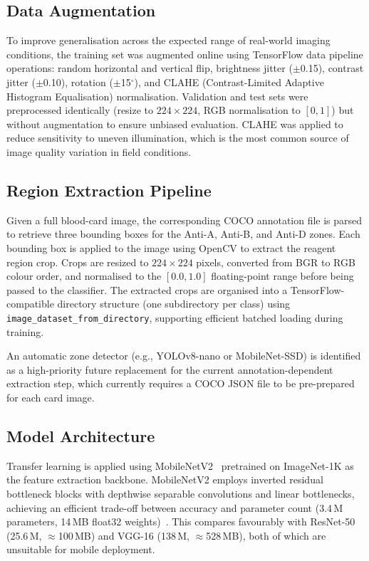 \documentclass[journal]{IEEEtran}
\begin{document}
\subsection{Data Augmentation}

To improve generalisation across the expected range of real-world
imaging conditions, the training set was augmented online using
TensorFlow data pipeline operations:
random horizontal and vertical flip, brightness jitter ($\pm$0.15),
contrast jitter ($\pm$0.10), rotation ($\pm$15$^{\circ}$),
and CLAHE (Contrast-Limited Adaptive Histogram Equalisation)
normalisation.
Validation and test sets were preprocessed identically (resize to
$224\times224$, RGB normalisation to $[0, 1]$) but without
augmentation to ensure unbiased evaluation.
CLAHE was applied to reduce sensitivity to uneven illumination,
which is the most common source of image quality variation in
field conditions.

\subsection{Region Extraction Pipeline}

Given a full blood-card image, the corresponding COCO annotation
file is parsed to retrieve three bounding boxes for the Anti-A,
Anti-B, and Anti-D zones.
Each bounding box is applied to the image using OpenCV to extract
the reagent region crop.
Crops are resized to $224\times224$ pixels, converted from BGR to
RGB colour order, and normalised to the $[0.0, 1.0]$ floating-point
range before being passed to the classifier.
The extracted crops are organised into a TensorFlow-compatible
directory structure (one subdirectory per class) using
\texttt{image\_dataset\_from\_directory}, supporting efficient
batched loading during training.

An automatic zone detector (e.g., YOLOv8-nano or MobileNet-SSD)
is identified as a high-priority future replacement for the
current annotation-dependent extraction step, which currently
requires a COCO JSON file to be pre-prepared for each card image.

\subsection{Model Architecture}

Transfer learning is applied using MobileNetV2~\cite{sandler2018}
pretrained on ImageNet-1K as the feature extraction backbone.
MobileNetV2 employs inverted residual bottleneck blocks with
depthwise separable convolutions and linear bottlenecks, achieving
an efficient trade-off between accuracy and parameter count
(3.4\,M parameters, 14\,MB float32 weights)~\cite{sandler2018}.
This compares favourably with ResNet-50 (25.6\,M, $\approx$100\,MB)
and VGG-16 (138\,M, $\approx$528\,MB), both of which are unsuitable
for mobile deployment.
\end{document}
